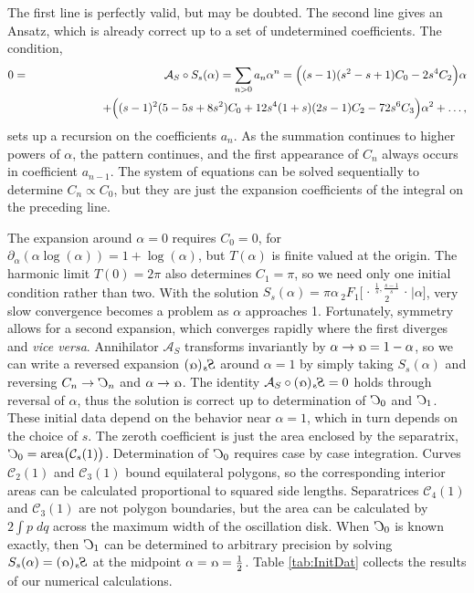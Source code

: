 \documentclass[nofootinbib,preprint]{revtex4-1}
\newcommand{\tFoIn}[3]{\,_2F_1 \Big[ 
\genfrac..{0pt}{}{#1}{#2}\Big| #3 \Big]}
\newcommand{\rev}[1]{\text{\reflectbox{$#1$}}}
\begin{document}
The first line is perfectly valid, but may be doubted. The second line gives an Ansatz,
which is already correct up to a set of undetermined coefficients. The condition,
\begin{eqnarray}
0&=&\mathcal{A}_S \circ S_s(\alpha) = \sum_{n>0}a_n \alpha^n = \Big((s-1)(s^2-s+1)C_0-2s^4 C_2\Big)\alpha  \nonumber \\ 
&&\hspace{2.0cm}
+ \Big( (s-1)^2(5-5s+8s^2)C_0 + 12 s^4 (1 + s) (2s -1)C_2 -72 s^6 C_3\Big)\alpha^2 + \ldots, \nonumber
\end{eqnarray}
sets up a recursion on the coefficients $a_n$. As the summation continues to 
higher powers of $\alpha$, the pattern continues, and the first appearance 
of $C_n$ always occurs in coefficient $a_{n-1}$. The system of equations can 
be solved sequentially to determine $C_n \propto C_0$, but they are just 
the expansion coefficients of the integral on the preceding line. 

The expansion around $\alpha=0$ requires $C_0=0$, for 
$\partial_{\alpha}(\alpha\log(\alpha))=1+\log(\alpha)$, but $T(\alpha)$ is finite 
valued at the origin. The harmonic limit $T(0)=2\pi$ also determines $C_1=\pi$, 
so we need only one initial condition rather than two. With the solution 
$S_s(\alpha)=\pi \alpha \tFoIn{\frac{1}{s},\frac{s-1}{s}}{2}{\alpha}$,
very slow convergence becomes a problem as $\alpha$ approaches 1. 
Fortunately, symmetry allows for a second expansion, which converges rapidly where 
the first diverges and \textit{vice versa}.
Annihilator $\mathcal{A}_S$ transforms invariantly by 
$\alpha \rightarrow \rev{\alpha}=1-\alpha$, so we can write a reversed 
expansion $\rev{S_s(\alpha)}$ around $\alpha=1$ by simply taking $S_s(\alpha)$
and reversing $C_n \rightarrow \rev{C}_n$ and $\alpha \rightarrow \rev{\alpha}$.
The identity $\mathcal{A}_S \circ \rev{S_s(\alpha)} = 0$ holds through reversal 
of $\alpha$, thus the solution is correct up to determination of $\rev{C}_0$ 
and $\rev{C}_1$. These initial data depend on the behavior near $\alpha=1$, which in 
turn depends on the choice of $s$. The zeroth coefficient is just the area enclosed by the separatrix, 
$ \rev{C}_0 = \text{area}\big(\mathcal{C}_s(1)\big)$. Determination of 
$\rev{C}_0$ requires case by case integration. Curves $\mathcal{C}_2(1)$ 
and $\mathcal{C}_3(1)$ bound equilateral polygons, so the corresponding 
interior areas can be calculated proportional to squared side lengths.
Separatrices  $\mathcal{C}_4(1)$ and $\mathcal{C}_3(1)$ are not polygon 
boundaries, but the area can be calculated by $2\int p\; dq$ across
the maximum width of the oscillation disk. When $\rev{C}_0$ is known exactly,
then $\rev{C}_1$ can be determined to arbitrary precision by solving 
$S_s(\alpha)=\rev{S_s(\alpha)}$ at the midpoint $\alpha=\rev{\alpha}=\frac{1}{2}$.
Table \ref{tab:InitDat} collects the results of our numerical calculations. 
\end{document}
